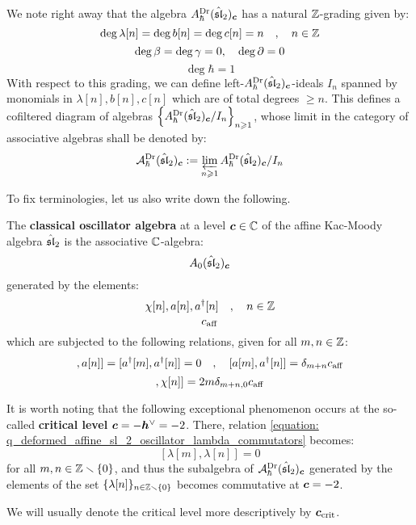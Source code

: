         We note right away that the algebra $A_{\hbar}^{\current}(\hat{\sl}_2)_{\level}$ has a natural $\Z$-grading given by:
            $$\deg \lambda[n] = \deg b[n] = \deg c[n] = n \quad, \quad n \in \Z$$
            $$\deg \beta = \deg \gamma = 0, \quad \deg \del = 0$$
            $$\deg \hbar = 1$$
        With respect to this grading, we can define left-$A_{\hbar}^{\current}(\hat{\sl}_2)_{\level}$-ideals $I_n$ spanned by monomials in $\lambda[n], b[n], c[n]$ which are of total degrees $\geq n$. This defines a cofiltered diagram of algebras $\left\{ A_{\hbar}^{\current}(\hat{\sl}_2)_{\level}/I_n \right\}_{n \geq 1}$, whose limit in the category of associative algebras shall be denoted by:
            $$\calA_{\hbar}^{\current}(\hat{\sl}_2)_{\level} := \projlim_{n \geq 1} A_{\hbar}^{\current}(\hat{\sl}_2)_{\level}/I_n$$

        To fix terminologies, let us also write down the following.
        \begin{definition} \label{def: classical_affine_sl_2_oscillator_algebra_drinfeld_current_presentation}
            The \textbf{classical oscillator algebra} at a level $\level \in \bbC$ of the affine Kac-Moody algebra $\hat{\sl}_2$ is the associative $\bbC$-algebra:
                $$A_0(\hat{\sl}_2)_{\level}$$
            generated by the elements:
                $$\chi[n], a[n], a^{\dagger}[n] \quad, \quad n \in \Z$$
                $$c_{\aff}$$
            which are subjected to the following relations, given for all $m, n \in \Z$:
                \begin{equation}
                    [ a[m], a[n] ] = [ a^{\dagger}[m], a^{\dagger}[n] ] = 0 \quad, \quad [ a[m], a^{\dagger}[n] ] = \delta_{m + n} c_{\aff}
                \end{equation}
                \begin{equation}
                    [ \chi[m], \chi[n] ] = 2m \delta_{m + n, 0} c_{\aff}
                \end{equation}
        \end{definition}

        \begin{remark} \label{remark: q_deformed_affine_sl_2_oscillator_algebra_drinfeld_current_presentation_at_critical_level}
            It is worth noting that the following exceptional phenomenon occurs at the so-called \textbf{critical level} $\level = -\dualcoxeter = -2$. There, relation \eqref{equation: q_deformed_affine_sl_2_oscillator_lambda_commutators} becomes:
                $$[\lambda[m], \lambda[n]] = 0$$
            for all $m, n \in \Z \setminus \{0\}$, and thus the subalgebra of $\calA_{\hbar}^{\current}(\hat{\sl}_2)_{\level}$ generated by the elements of the set $\{ \lambda[n] \}_{n \in \Z \setminus \{0\}}$ becomes commutative at $\level = -2$.
        \end{remark}
        \begin{convention}
            We will usually denote the critical level more descriptively by $\level_{\crit}$.
        \end{convention}
        
